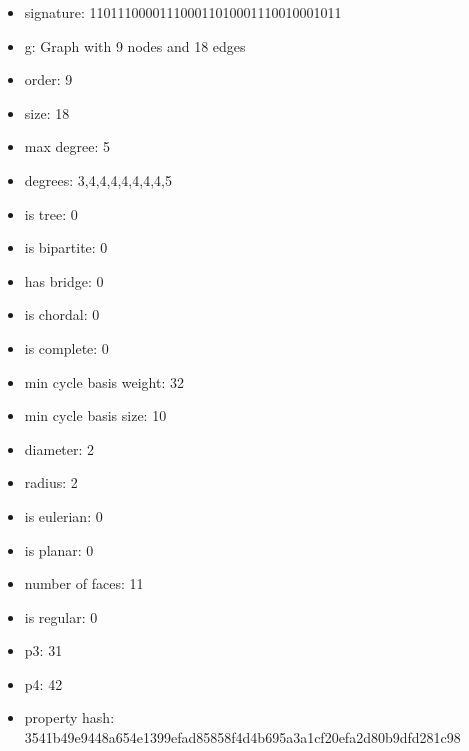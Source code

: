 \newpage
\begin{figure}
\end{figure}
\begin{itemize}
\item signature: 110111000011100011010001110010001011
\item g: Graph with 9 nodes and 18 edges
\item order: 9
\item size: 18
\item max degree: 5
\item degrees: 3,4,4,4,4,4,4,4,5
\item is tree: 0
\item is bipartite: 0
\item has bridge: 0
\item is chordal: 0
\item is complete: 0
\item min cycle basis weight: 32
\item min cycle basis size: 10
\item diameter: 2
\item radius: 2
\item is eulerian: 0
\item is planar: 0
\item number of faces: 11
\item is regular: 0
\item p3: 31
\item p4: 42
\item property hash: 3541b49e9448a654e1399efad85858f4d4b695a3a1cf20efa2d80b9dfd281c98
\end{itemize}
